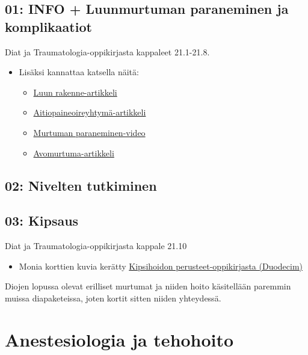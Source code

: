 \documentclass[
]{book}
\providecommand{\tightlist}{%
  \setlength{\itemsep}{0pt}\setlength{\parskip}{0pt}}
\begin{document}
\section{01: INFO + Luunmurtuman paraneminen ja komplikaatiot}\label{info-luunmurtuman-paraneminen-ja-komplikaatiot}

Diat ja Traumatologia-oppikirjasta kappaleet 21.1-21.8.

\begin{itemize}
\item
  Lisäksi kannattaa katsella näitä:

  \begin{itemize}
  \tightlist
  \item
    \href{https://open.oregonstate.education/aandp/chapter/6-3-bone-structure/}{Luun rakenne-artikkeli}
  \item
    \href{https://say.fi/files/lehtovakkalakaakinen_aitiopaine.pdf}{Aitiopaineoireyhtymä-artikkeli}
  \item
    \href{https://youtu.be/ZD_5Why69IM?si=IJFrbGAw79Cy18Fe}{Murtuman paraneminen-video}
  \item
    \href{https://www.oppiportti.fi/oppikirjat/kia00380?q=avomurtuma}{Avomurtuma-artikkeli}
  \end{itemize}
\end{itemize}

\section{02: Nivelten tutkiminen}\label{nivelten-tutkiminen}

\section{03: Kipsaus}\label{kipsaus}

Diat ja Traumatologia-oppikirjasta kappale 21.10

\begin{itemize}
\tightlist
\item
  Monia korttien kuvia kerätty \href{https://www.oppiportti.fi/oppikirjat/kps00001}{Kipsihoidon perusteet-oppikirjasta (Duodecim)}
\end{itemize}

Diojen lopussa olevat erilliset murtumat ja niiden hoito käsitellään paremmin muissa diapaketeissa, joten kortit sitten niiden yhteydessä.

\chapter{Anestesiologia ja tehohoito}\label{anestesiologia-ja-tehohoito}
\end{document}
